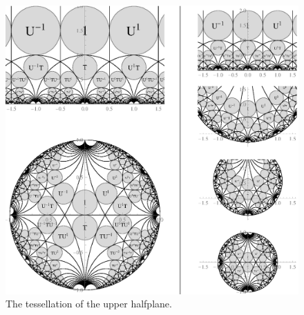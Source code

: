 
\begin{figure}
\centering
\includegraphics[width=\textwidth]{figures/modular-tiling-1}
\caption{The tessellation of the upper halfplane.}
\label{fig_ModularTiling}
\end{figure}
